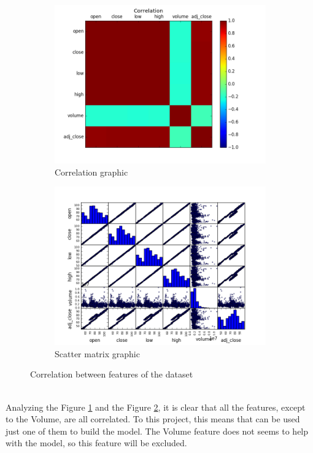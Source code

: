 \begin{figure}[H]
\centering
\begin{subfigure}{.5\textwidth}
  \centering
  \includegraphics[width=.8\linewidth]{figures/correlation_nvs.png}
  \caption{Correlation graphic}
  \label{fig:nvs_correlation}
\end{subfigure}%
\begin{subfigure}{.5\textwidth}
  \centering
  \includegraphics[width=.8\linewidth]{figures/scatter_matrix_nvs.png}
  \caption{Scatter matrix graphic}
  \label{fig:nvs_scatter_matrix}
\end{subfigure}
\caption{Correlation between features of the dataset}
\label{fig:features_correlation}
\end{figure}
\ \\
Analyzing the Figure \ref{fig:nvs_correlation} and the Figure \ref{fig:nvs_scatter_matrix}, it is clear that all the features, except to the Volume, are all correlated. To this project,
this means that can be used just one of them to build the model. The Volume feature does not seems to help with the model, so this feature will be excluded.

